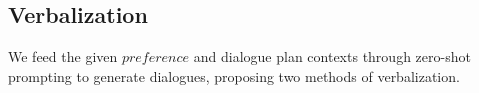 
\subsection{Verbalization} 
\label{sec:verbalization}
We feed the given $preference$ and dialogue plan contexts through zero-shot prompting to generate dialogues, proposing two methods of verbalization. 


\vspace{-0.5em}
